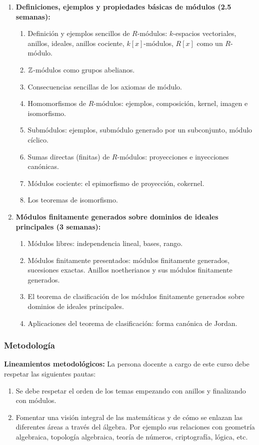 \begin{refsection}
\begin{enumerate}
\item \textbf{Definiciones, ejemplos y propiedades básicas de módulos (2.5 semanas):} 
\begin{enumerate}
    \item Definición y ejemplos sencillos de $R$-módulos: $k$-espacios vectoriales, anillos, ideales, anillos cociente, $k[x]$-módulos, $R[x]$ como un $R$-módulo.
    \item $\mathbb{Z}$-módulos como grupos abelianos.
    \item Consecuencias sencillas de los axiomas de módulo.
    \item Homomorfismos de $R$-módulos: ejemplos, composición, kernel, imagen e isomorfismo.
    \item Submódulos: ejemplos, submódulo generado por un subconjunto, módulo cíclico.
    \item Sumas directas (finitas) de $R$-módulos: proyecciones e inyecciones canónicas.
    \item Módulos cociente: el epimorfismo de proyección, cokernel.
    \item Los teoremas de isomorfismo.
\end{enumerate}

\item \textbf{Módulos finitamente generados sobre dominios de ideales principales (3 semanas):} 
\begin{enumerate}
    \item Módulos libres: independencia lineal, bases, rango.
    \item Módulos finitamente presentados: módulos finitamente generados, sucesiones exactas. Anillos noetherianos y sus módulos finitamente generados.
    \item El teorema de clasificación de los módulos finitamente generados sobre dominios de ideales principales.
    \item Aplicaciones del teorema de clasificación: forma canónica de Jordan.
\end{enumerate}

\end{enumerate}

\subsubsection*{Metodología}

\noindent \textbf{Lineamientos metodológicos:} La persona docente a cargo de este curso debe respetar las siguientes pautas:
\begin{enumerate}
    \item Se debe respetar el orden de los temas empezando con anillos y finalizando con módulos.
    \item Fomentar una visión integral de las matemáticas y de cómo se enlazan las diferentes áreas a través del álgebra. Por ejemplo sus relaciones con geometría algebraica, topología algebraica, teoría de números, criptografía, lógica, etc.
\end{enumerate}


\end{refsection}
